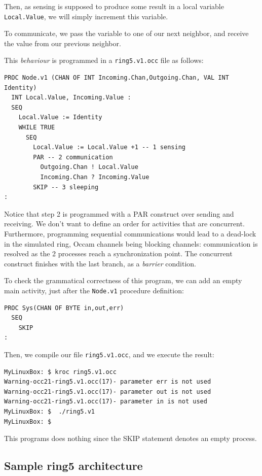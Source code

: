 \documentclass[times]{book}
\begin{document}
Then, as sensing is supposed to produce some result in a local variable {\tt Local.Value},
we will simply increment this variable. 

To communicate, we pass the variable to one of our next neighbor, and receive the value 
from our previous neighbor.

This {\sl behaviour} is programmed in a {\tt ring5.v1.occ} file as follows:


\begin{lstlisting}  
PROC Node.v1 (CHAN OF INT Incoming.Chan,Outgoing.Chan, VAL INT Identity)  
  INT Local.Value, Incoming.Value :
  SEQ
    Local.Value := Identity
    WHILE TRUE
      SEQ
        Local.Value := Local.Value +1 -- 1 sensing
        PAR -- 2 communication
          Outgoing.Chan ! Local.Value
          Incoming.Chan ? Incoming.Value
        SKIP -- 3 sleeping
:
\end{lstlisting} 

Notice that step 2 is programmed with a PAR construct over sending and receiving.
We don't want to define an order for activities that are concurrent. Furthermore,
programming sequential communications would lead to a dead-lock in the
simulated ring, Occam channels being blocking channels: communication is resolved
as the 2 processes reach a synchronization point.
The concurrent construct finishes with the last branch, as a {\sl barrier} condition.

To check the grammatical correctness of this program, we can add an empty 
main activity, just after the {\tt Node.v1} procedure definition:

\begin{lstlisting}  
PROC Sys(CHAN OF BYTE in,out,err)
  SEQ
    SKIP
:
\end{lstlisting}  

Then, we compile our file {\tt ring5.v1.occ}, and we execute the result:

\begin{lstlisting}  
MyLinuxBox: $ kroc ring5.v1.occ
Warning-occ21-ring5.v1.occ(17)- parameter err is not used
Warning-occ21-ring5.v1.occ(17)- parameter out is not used
Warning-occ21-ring5.v1.occ(17)- parameter in is not used 
MyLinuxBox: $  ./ring5.v1
MyLinuxBox: $ 
\end{lstlisting} 

This programs does nothing since the SKIP statement denotes an empty process.

\subsection {Sample ring5 architecture}
\label{sec:simpleRigV2}
\end{document}
